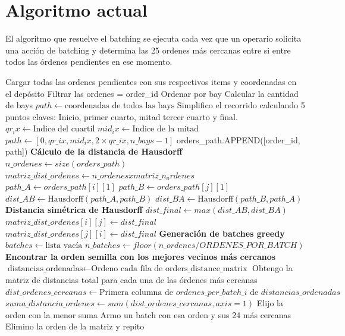 \documentclass[a4paper,openany]{memoir}
\begin{document}
\section{Algoritmo actual}
El algoritmo que resuelve el batching se ejecuta cada vez que un operario solicita una acción de batching y determina las 25 ordenes más cercanas entre si entre todos las órdenes pendientes en ese momento.

\begin{algorithm}
\caption{Algoritmo de Batching}
\begin{algorithmic}[1]
\STATE Cargar todas las ordenes pendientes con sus respectivos items y coordenadas en el depósito
    \STATE Filtrar las ordenes = order\_id
    \STATE Ordenar por bay
    \STATE Calcular la cantidad de bays
        \STATE  $path \gets \text{coordenadas de todos las bays}$
    \ELSE 
        \STATE Simplifico el recorrido calculando 5 puntos claves: Inicio, primer cuarto, mitad tercer cuarto y final.
        \STATE $qr_ix \gets \text{Indice del cuartil}$
        \STATE $mid_ix \gets \text{Indice de la mitad}$
        \STATE $path \gets \left[0, qr\_ix, mid_ix, 2 \times qr\_ix, n\_bays-1 \right]$
    \ENDIF
    \STATE orders\_path.APPEND([order\_id, path])  
\ENDFOR
\STATE \textbf{Cálculo de la distancia de Hausdorff}
\STATE $n\_ordenes \gets size(orders\_path)$
\STATE $matriz\_dist\_ordenes \gets n\_ordenes x matriz\_n_ordenes$
    \STATE $path\_A \gets orders\_path[i][1]$
        \STATE $path\_B \gets orders\_path[j][1]$
        \STATE $dist\_AB \gets \text{Hausdorff}(path\_A, path\_B)$
        \STATE $dist\_BA \gets \text{Hausdorff}(path\_B, path\_A)$
        \STATE  \textbf{Distancia simétrica de Hausdorff}
        \STATE $dist\_final \gets max(dist\_AB,dist\_BA)$
        \STATE $matriz\_dist\_ordenes[i][j] \gets dist\_final $
        \STATE $matriz\_dist\_ordenes[j][i] \gets dist\_final $ 
    \ENDFOR
\ENDFOR
\STATE  \textbf{Generación de batches greedy}
\STATE $batches \gets \text{lista vacía}$
\STATE $n\_batches \gets floor(n\_ordenes/ORDENES\_POR\_BATCH) $
    \STATE \textbf{Encontrar la orden semilla con los mejores vecinos más cercanos} 
    \STATE $\text{distancias\_ordenadas} \leftarrow \text{Ordeno cada fila de } \text{orders\_distance\_matrix}$
    \STATE Obtengo la matriz de distancias total para cada una de las órdenes más cercanas
    \STATE $ dist\_ordenes\_cercanas \gets \text{Primera columna de } ordenes\_per\_batch\_i \text{ de } distancias\_ordenadas$
    \STATE $suma\_distancia\_ordenes \gets sum(dist\_ordenes\_cercanas, axis=1)$
    \STATE Elijo la orden con la menor suma
    \STATE Armo un batch con esa orden y sus 24 más cercanas
    \STATE Elimino la orden de la matriz y repito

\ENDFOR

\end{algorithmic}
\end{algorithm} 
\end{document}

